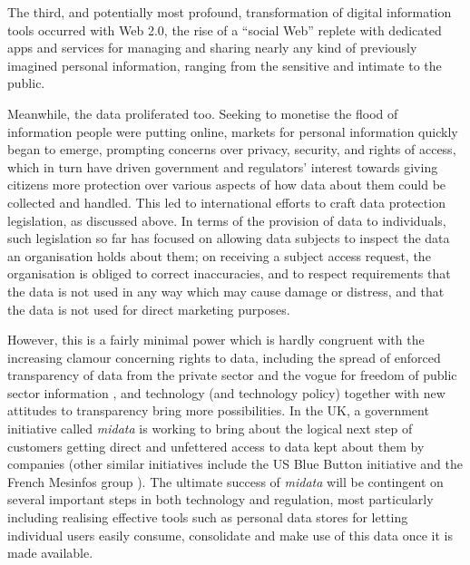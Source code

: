 \documentclass[graybox]{svmult}
\begin{document}


The third, and potentially most profound, transformation of digital information tools occurred with Web 2.0, the rise of a ``social Web'' replete with dedicated apps and services for managing and sharing nearly any kind of previously imagined personal information, ranging from the sensitive and intimate to the public.  

Meanwhile, the data proliferated too. Seeking to monetise the flood of information people were putting online, markets for personal information quickly began to emerge, prompting concerns over privacy, security, and rights of access, which in turn have driven government and regulators’ interest towards giving citizens more protection over various aspects of how data about them could be collected and handled.  This led to international efforts to craft data protection legislation, as discussed above.  In terms of the provision of data to individuals, such legislation so far has focused on allowing data subjects to inspect the data an organisation holds about them; on receiving a subject access request, the organisation is obliged to correct inaccuracies, and to respect requirements that the data is not used in any way which may cause damage or distress, and that the data is not used for direct marketing purposes.

However, this is a fairly minimal power which is hardly congruent with the increasing clamour concerning rights to data, including the spread of enforced transparency of data from the private sector \cite{} and the vogue for freedom of public sector information \cite{}, and technology (and technology policy) together with new attitudes to transparency bring more possibilities. In the UK, a government initiative called \emph{midata} \cite{midata} is working to bring about the logical next step of customers getting direct and unfettered access to data kept about them by companies (other similar initiatives include the US Blue Button initiative \cite{} and the French Mesinfos group \cite{}).  The ultimate success of \emph{midata} will be contingent on several important steps in both technology and regulation, most particularly including realising effective tools such as personal data stores for letting individual users easily consume, consolidate and make use of this data once it is made available.
\end{document}
